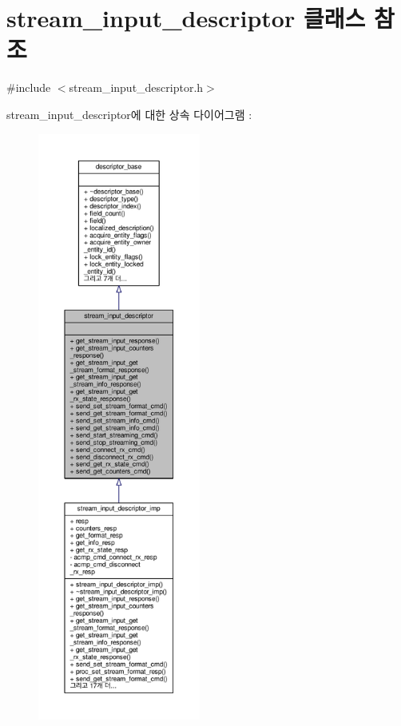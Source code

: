 \hypertarget{classavdecc__lib_1_1stream__input__descriptor}{}\section{stream\+\_\+input\+\_\+descriptor 클래스 참조}
\label{classavdecc__lib_1_1stream__input__descriptor}


{\ttfamily \#include $<$stream\+\_\+input\+\_\+descriptor.\+h$>$}



stream\+\_\+input\+\_\+descriptor에 대한 상속 다이어그램 \+: 
\nopagebreak
\begin{figure}[H]
\begin{center}
\leavevmode
\includegraphics[height=550pt]{classavdecc__lib_1_1stream__input__descriptor__inherit__graph}
\end{center}
\end{figure}


